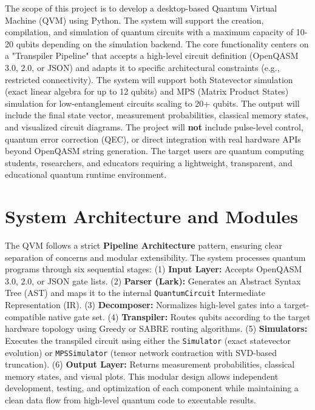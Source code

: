 The scope of this project is to develop a desktop-based Quantum Virtual Machine (QVM) using Python. The system will support the creation, compilation, and simulation of quantum circuits with a maximum capacity of 10-20 qubits depending on the simulation backend. The core functionality centers on a "Transpiler Pipeline" that accepts a high-level circuit definition (OpenQASM 3.0, 2.0, or JSON) and adapts it to specific architectural constraints (e.g., restricted connectivity). The system will support both Statevector simulation (exact linear algebra for up to 12 qubits) and MPS (Matrix Product States) simulation for low-entanglement circuits scaling to 20+ qubits. The output will include the final state vector, measurement probabilities, classical memory states, and visualized circuit diagrams. The project will \textbf{not} include pulse-level control, quantum error correction (QEC), or direct integration with real hardware APIs beyond OpenQASM string generation. The target users are quantum computing students, researchers, and educators requiring a lightweight, transparent, and educational quantum runtime environment.




\section{System Architecture and Modules}

The QVM follows a strict \textbf{Pipeline Architecture} pattern, ensuring clear separation of concerns and modular extensibility. The system processes quantum programs through six sequential stages: (1) \textbf{Input Layer:} Accepts OpenQASM 3.0, 2.0, or JSON gate lists. (2) \textbf{Parser (Lark):} Generates an Abstract Syntax Tree (AST) and maps it to the internal \texttt{QuantumCircuit} Intermediate Representation (IR). (3) \textbf{Decomposer:} Normalizes high-level gates into a target-compatible native gate set. (4) \textbf{Transpiler:} Routes qubits according to the target hardware topology using Greedy or SABRE routing algorithms. (5) \textbf{Simulators:} Executes the transpiled circuit using either the \texttt{Simulator} (exact statevector evolution) or \texttt{MPSSimulator} (tensor network contraction with SVD-based truncation). (6) \textbf{Output Layer:} Returns measurement probabilities, classical memory states, and visual plots. This modular design allows independent development, testing, and optimization of each component while maintaining a clean data flow from high-level quantum code to executable results.



